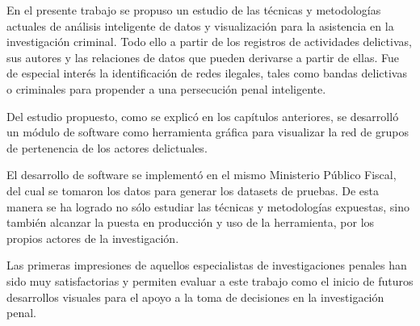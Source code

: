 En el presente trabajo se propuso un estudio de las técnicas y metodologías actuales de análisis inteligente de datos y visualización para la asistencia en la investigación criminal. Todo ello a partir de los registros de actividades delictivas, sus autores y las relaciones de datos que pueden derivarse a partir de ellas. Fue de especial interés la identificación de redes ilegales, tales como bandas delictivas o criminales para propender a una persecución penal inteligente.

Del estudio propuesto, como se explicó en los capítulos anteriores, se desarrolló un módulo de software como herramienta gráfica para visualizar la red de grupos de pertenencia de los actores delictuales.

El desarrollo de software se implementó en el mismo Ministerio Público Fiscal, del cual se tomaron los datos para generar los datasets de pruebas. De esta manera se ha logrado no sólo estudiar las técnicas y metodologías expuestas, sino también alcanzar la puesta en producción y uso de la herramienta, por los propios actores de la investigación.

Las primeras impresiones de aquellos especialistas de investigaciones penales han sido muy satisfactorias y permiten evaluar a este trabajo como el inicio de futuros desarrollos visuales para el apoyo a la toma de decisiones en la investigación penal.
